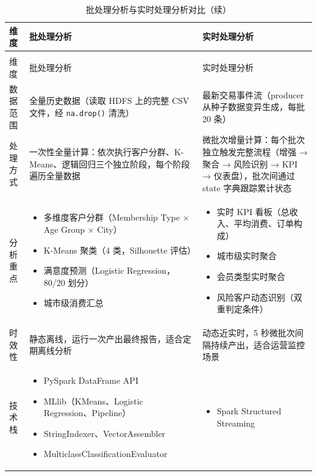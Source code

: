 \documentclass[12pt,hyperref,a4paper,UTF8]{ctexart}
\begin{document}
\begin{longtable}{p{2.4cm}p{5.2cm}p{5.2cm}}
\caption{批处理分析与实时处理分析对比} \\
\toprule
维度 & 批处理分析 & 实时处理分析 \\
\midrule
\endfirsthead
\caption{批处理分析与实时处理分析对比（续）} \\
\toprule
维度 & 批处理分析 & 实时处理分析 \\
\midrule
\endhead
\bottomrule
\endfoot
数据范围 & 全量历史数据（读取 HDFS 上的完整 CSV 文件，经 \texttt{na.drop()} 清洗） & 最新交易事件流（producer 从种子数据变异生成，每批 20 条） \\
\midrule
处理方式 & 一次性全量计算：依次执行客户分群、K-Means、逻辑回归三个独立阶段，每个阶段遍历全量数据 & 微批次增量计算：每个批次独立触发完整流程（增强 → 聚合 → 风险识别 → KPI → 仪表盘），批次间通过 state 字典跟踪累计状态 \\
\midrule
分析重点 & \begin{itemize}
    \item 多维度客户分群（Membership Type × Age Group × City）
    \item K-Means 聚类（4 类，Silhouette 评估）
    \item 满意度预测（Logistic Regression，80/20 划分）
    \item 城市级消费汇总
\end{itemize} & \begin{itemize}
    \item 实时 KPI 看板（总收入、平均消费、订单构成）
    \item 城市级实时聚合
    \item 会员类型实时聚合
    \item 风险客户动态识别（双重判定条件）
\end{itemize} \\
\midrule
时效性 & 静态离线，运行一次产出最终报告，适合定期离线分析 & 动态近实时，5 秒微批次间隔持续产出，适合运营监控场景 \\
\midrule
技术栈 & \begin{itemize}
    \item PySpark DataFrame API
    \item MLlib（KMeans、Logistic Regression、Pipeline）
    \item StringIndexer、VectorAssembler
    \item MulticlassClassificationEvaluator
\end{itemize} & \begin{itemize}
    \item Spark Structured Streaming

\end{itemize}
\end{longtable}
\end{document}
